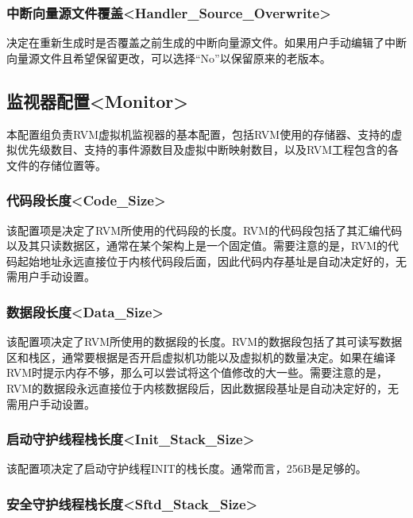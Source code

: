 \subsubsection{中断向量源文件覆盖<Handler\_Source\_Overwrite>{}}\label{subsubsec:5-3-12-22}

决定在重新生成时是否覆盖之前生成的中断向量源文件。如果用户手动编辑了中断向量源文件且希望保留更改，可以选择``No''以保留原来的老版本。

\subsection{监视器配置<Monitor>{}}\label{subsec:5-3-13}

本配置组负责RVM虚拟机监视器的基本配置，包括RVM使用的存储器、支持的虚拟优先级数目、支持的事件源数目及虚拟中断映射数目，以及RVM工程包含的各文件的存储位置等。

\subsubsection{代码段长度<Code\_Size>{}}\label{subsubsec:5-3-13-1}

该配置项是决定了RVM所使用的代码段的长度。RVM的代码段包括了其汇编代码以及其只读数据区，通常在某个架构上是一个固定值。需要注意的是，RVM的代码起始地址永远直接位于内核代码段后面，因此代码内存基址是自动决定好的，无需用户手动设置。

\subsubsection{数据段长度<Data\_Size>{}}\label{subsubsec:5-3-13-2}

该配置项决定了RVM所使用的数据段的长度。RVM的数据段包括了其可读写数据区和栈区，通常要根据是否开启虚拟机功能以及虚拟机的数量决定。如果在编译RVM时提示内存不够，那么可以尝试将这个值修改的大一些。需要注意的是，RVM的数据段永远直接位于内核数据段后，因此数据段基址是自动决定好的，无需用户手动设置。

\subsubsection{启动守护线程栈长度<Init\_Stack\_Size>{}}\label{subsubsec:5-3-13-3}

该配置项决定了启动守护线程INIT的栈长度。通常而言，256B是足够的。

\subsubsection{安全守护线程栈长度<Sftd\_Stack\_Size>{}}\label{subsubsec:5-3-13-4}

